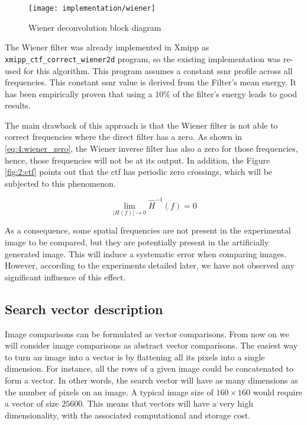 \documentclass[../main.tex]{subfiles}
\begin{document}
\begin{figure}[htbp]
    \centering
    \texttt{[image: implementation/wiener]}
    \caption{Wiener deconvolution block diagram}
    \label{fig:4:wiener_block}
\end{figure}

The Wiener filter was already implemented in Xmipp\cite{sorzano2004} as \texttt{xmipp\_ctf\_correct\_wiener2d} program, so the existing implementation was re-used for this algorithm. This program assumes a constant \gls{ssnr} profile across all frequencies. This constant \gls{ssnr} value is derived from the Filter's mean energy. It has been empirically proven that using a $10\si{\percent}$ of the filter's energy leads to good results\cite{grigorieff2017}.

The main drawback of this approach is that the Wiener filter is not able to correct frequencies where the direct filter has a zero. As shown in \eqref{eq:4:wiener_zero}, the Wiener inverse filter has also a zero for those frequencies, hence, those frequencies will not be at its output. In addition, the Figure \ref{fig:2:ctf} points out that the \gls{ctf} has periodic zero crossings, which will be subjected to this phenomenon.

\begin{equation}\label{eq:4:wiener_zero}
    \lim_{\left\vert H(f) \right\vert \rightarrow 0} \hat{H}^{-1}(f) = 0
\end{equation} 

As a consequence, some spatial frequencies are not present in the experimental image to be compared, but they are potentially present in the artificially generated image. This will induce a systematic error when comparing images. However, according to the experiments detailed later, we have not observed any significant influence of this effect. 

\subsection{Search vector description}
Image comparisons can be formulated as vector comparisons. From now on we will consider image comparisons as abstract vector comparisons. The easiest way to turn an image into a vector is by flattening all its pixels into a single dimension. For instance, all the rows of a given image could be concatenated to form a vector. In other words, the search vector will have as many dimensions as the number of pixels on an image. A typical image size of $160\times160$ would require a vector of size $25600$. This means that vectors will have a very high dimensionality, with the associated computational and storage cost.
\end{document}
